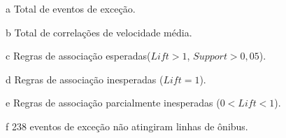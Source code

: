 \documentclass[
	12pt,				%
	oneside,			%
	a4paper,			%
	english,			%
	brazil				%
	]{abntex2ppgsi}
\begin{document}
{{\begin{apendicesenv}
\begin{table}[!htb]
\begin{threeparttable}
\begin{tablenotes}
            \item[a] Total de eventos de exceção.
            \item[b] Total de correlações de velocidade média.
            \item[c] Regras de associação esperadas($Lift > 1$, $Support > 0,05$).
            \item[d] Regras de associação inesperadas ($Lift = 1$).
            \item[e] Regras de associação parcialmente inesperadas ($0 < Lift < 1$).
            \item[f] 238 eventos de exceção não atingiram linhas de ônibus.
        \end{tablenotes}
\end{threeparttable}
\end{table}



\end{apendicesenv}}}
\end{document}
